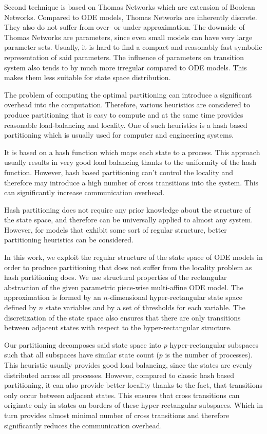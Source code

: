 \documentclass[12pt,oneside]{fithesis2}
\begin{document}
			Second technique is based on Thomas Networks \cite{Thomas} which are extension of Boolean Networks. Compared to ODE models, Thomas Networks are inherently discrete. They also do not suffer from over- or under-approximation. The downside of Thomas Networks are parameters, since even small models can have very large parameter sets. Usually, it is hard to find a compact and reasonably fast symbolic representation of said parameters. The influence of parameters on transition system also tends to by much more irregular compared to ODE models. This makes them less suitable for state space distribution.			
			
			The problem of computing the optimal partitioning can introduce a significant overhead into the computation. Therefore, various heuristics are considered to produce partitioning that is easy to compute and at the same time provides reasonable load-balancing and locality. One of such heuristics is a hash based partitioning \cite{spin} which is usually used for computer and engineering systems.
			
			It is based on a hash function which maps each state to a process. This approach usually results in very good load balancing thanks to the uniformity of the hash function. However, hash based partitioning can't control the locality and therefore may introduce a high number of cross transitions into the system. This can significantly increase communication overhead.			
			
			Hash partitioning does not require any prior knowledge about the structure of the state space, and therefore can be universally applied to almost any system. However, for models that exhibit some sort of regular structure, better partitioning heuristics can be considered.
			
			In this work, we exploit the regular structure of the state space of ODE models in order to produce partitioning that does not suffer from the locality problem as hash partitioning does. We use structural properties of the rectangular abstraction of the given parametric piece-wise multi-affine ODE model. The approximation is formed by an $n$-dimensional hyper-rectangular state space defined by $n$ state variables and by a set of thresholds for each variable. The discretization of the state space also ensures that there are only transitions between adjacent states with respect to the hyper-rectangular structure.
			
			Our partitioning decomposes said state space into $p$ hyper-rect\-angu\-lar subspaces such that all subspaces have similar state count ($p$ is the number of processes). This heuristic usually provides good load balancing, since the states are evenly distributed across all processes. However, compared to classic hash based partitioning, it can also provide better locality thanks to the fact, that transitions only occur between adjacent states. This ensures that cross transitions can originate only in states on borders of these hyper-rectangular subspaces. Which in turn provides almost minimal number of cross transitions and therefore significantly reduces the communication overhead.
			
\end{document}
